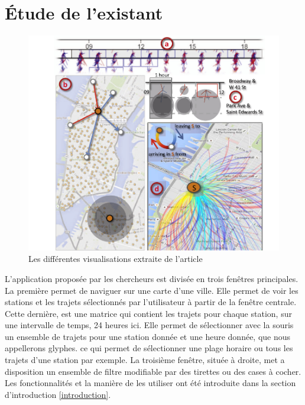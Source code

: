 \documentclass[12pt]{article}
\begin{document}
	\section{Étude de l’existant}	\label{etude_de_lexistant}
	\begin{figure}[!h]
	\begin{center}
	\includegraphics[scale=.3]{screenshot_article.png}
	\caption{Les différentes visualisations extraite de l'article \cite{Oli16}}
	\end{center}
	\end{figure}
	
	L’application proposée par les chercheurs est divisée en trois fenêtres principales.
	La première permet de naviguer sur une carte d’une ville. Elle permet de voir les
	stations et les trajets sélectionnés par l’utilisateur à partir de la fenêtre centrale.
	Cette dernière, est une matrice qui contient les trajets pour chaque station, sur une
	intervalle de temps, 24 heures ici. Elle permet de sélectionner avec la souris un
	ensemble de trajets pour une station donnée et une heure donnée, que nous appellerons glyphes.
	ce qui permet de sélectionner une plage horaire ou tous les trajets d'une station par exemple.
	La troisième fenêtre, située à droite, met a disposition un ensemble de filtre modifiable
	par des tirettes ou des cases à cocher. \\
	
	Les fonctionnalités et la manière de les utiliser ont été introduite dans la section
	d'introduction \ref{introduction}.\\
\end{document}
